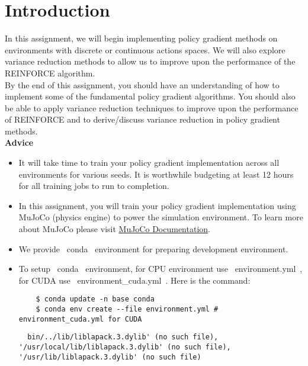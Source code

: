 \section{Introduction}

In this assignment, we will begin implementing policy gradient methods on environments with discrete or continuous actions spaces. We will also explore variance reduction methods to allow us to improve upon the performance of the REINFORCE algorithm. \\

By the end of this assignment, you should have an understanding of how to implement some of the fundamental policy gradient algorithms. You should also be able to apply variance reduction techniques to improve upon the performance of REINFORCE and to derive/discuss variance reduction in policy gradient methods. \\

\textbf{Advice}

\begin{itemize}
  \item It will take time to train your policy gradient implementation across all environments for various seeds. It is worthwhile budgeting at least 12 hours for all training jobs to run to completion.

  \item In this assignment, you will train your policy gradient implementation using MuJoCo (physics engine) to power the simulation environment. To learn more about MuJoCo please visit \href{https://mujoco.readthedocs.io/en/latest/overview.html}{MuJoCo Documentation}.

  \item We provide ~conda~ environment for preparing development environment.

  \item To setup ~conda~ environment, for CPU environment use ~environment.yml~, for CUDA use ~environment_cuda.yml~. Here is the command:
    \begin{lstlisting}
    $ conda update -n base conda
    $ conda env create --file environment.yml #  environment_cuda.yml for CUDA
    \end{lstlisting}

  \begin{lstlisting}
  bin/../lib/liblapack.3.dylib' (no such file), '/usr/local/lib/liblapack.3.dylib' (no such file), '/usr/lib/liblapack.3.dylib' (no such file)
  \end{lstlisting}


\end{itemize}

